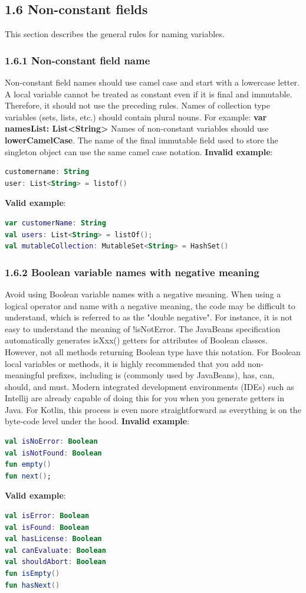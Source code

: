 \subsection*{\textbf{1.6 Non-constant fields}}
\label{sec:1.6}
This section describes the general rules for naming variables.
\subsubsection*{\textbf{1.6.1 Non-constant field name}}
\leavevmode\newline
\label{sec:1.6.1}
Non-constant field names should use camel case and start with a lowercase letter.
A local variable cannot be treated as constant even if it is final and immutable. Therefore, it should not use the preceding rules. Names of collection type variables (sets, lists, etc.) should contain plural nouns.
For example: \textbf{var namesList: List<String>}
Names of non-constant variables should use \textbf{lowerCamelCase}. The name of the final immutable field used to store the singleton object can use the same camel case notation.
\textbf{Invalid example}:
\begin{lstlisting}[language=Kotlin]
customername: String
user: List<String> = listof()
\end{lstlisting}
\textbf{Valid example}:
\begin{lstlisting}[language=Kotlin]
var customerName: String
val users: List<String> = listOf();
val mutableCollection: MutableSet<String> = HashSet()
\end{lstlisting}
\subsubsection*{\textbf{1.6.2 Boolean variable names with negative meaning}}
\leavevmode\newline
\label{sec:1.6.2}
Avoid using Boolean variable names with a negative meaning. When using a logical operator and name with a negative meaning, the code may be difficult to understand, which is referred to as the "double negative".
For instance, it is not easy to understand the meaning of !isNotError.
The JavaBeans specification automatically generates isXxx() getters for attributes of Boolean classes.
However, not all methods returning Boolean type have this notation.
For Boolean local variables or methods, it is highly recommended that you add non-meaningful prefixes, including is (commonly used by JavaBeans), has, can, should, and must. Modern integrated development environments (IDEs) such as Intellij are already capable of doing this for you when you generate getters in Java. For Kotlin, this process is even more straightforward as everything is on the byte-code level under the hood.
\textbf{Invalid example}:
\begin{lstlisting}[language=Kotlin]
val isNoError: Boolean
val isNotFound: Boolean
fun empty()
fun next();
\end{lstlisting}
\textbf{Valid example}:
\begin{lstlisting}[language=Kotlin]
val isError: Boolean
val isFound: Boolean
val hasLicense: Boolean
val canEvaluate: Boolean
val shouldAbort: Boolean
fun isEmpty()
fun hasNext()
\end{lstlisting}

